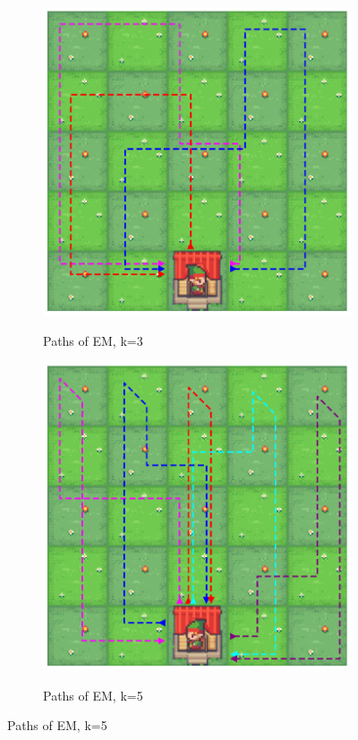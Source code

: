 \documentclass[letterpaper]{article} %
\begin{document}
\begin{figure}[t]
\begin{center}
    \begin{subfigure}{0.5\linewidth}
        \centering
        \caption{Paths of EM, k=3}
        \includegraphics[width=\linewidth]{pics/paths/k=3.png}
        \label{fig:results_resource_k=3}
    \end{subfigure}%
    \hfill%
    \begin{subfigure}{0.5\linewidth}
        \centering
        \caption{Paths of EM, k=5}
        \includegraphics[width=\linewidth]{pics/paths/k=5.png}
        \label{fig:results_resource_k=5}
    \end{subfigure}
    

\end{center}
\end{figure}
\end{document}
